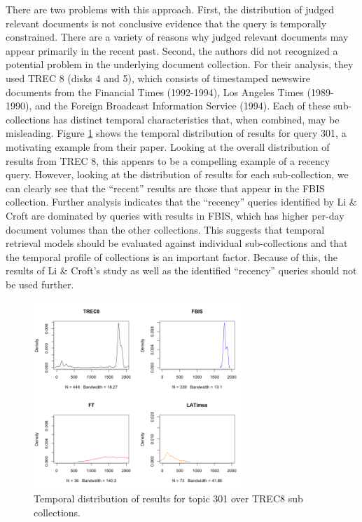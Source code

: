\documentclass{sig-alternate}
\begin{document}
There are two problems with this approach. First, the distribution of judged relevant documents is not conclusive evidence that the query is temporally constrained. There are a variety of reasons why judged relevant documents may appear primarily in the recent past. Second, the authors did not recognized a potential problem in the underlying document collection.  For their analysis, they used TREC 8 (disks 4 and 5), which consists of timestamped newswire documents from the Financial Times (1992-1994), Los Angeles Times (1989-1990), and the Foreign Broadcast Information Service (1994).  Each of these sub-collections has distinct temporal characteristics that, when combined, may be misleading. Figure \ref{figure.licroft} shows the temporal distribution of results for query 301, a motivating example from their paper.  Looking at the overall distribution of results from TREC 8, this appears to be a compelling example of a recency query.   However, looking at the distribution of results for each sub-collection, we can clearly see that the ``recent'' results are those that appear in the FBIS collection.  Further analysis indicates that the ``recency'' queries identified by Li \& Croft are dominated by queries with results in FBIS, which has higher per-day document volumes than the other collections.  This suggests that temporal retrieval models should be evaluated against individual sub-collections and that the temporal profile of collections is an important factor.  Because of this, the results of Li \& Croft's study as well as the identified ``recency'' queries should not be used further.

\begin{figure}
\includegraphics[width=8cm]{images/301.png}
\caption{Temporal distribution of results for topic 301 over TREC8 sub collections.}
\label{figure.licroft}
\end{figure}
\end{document}

